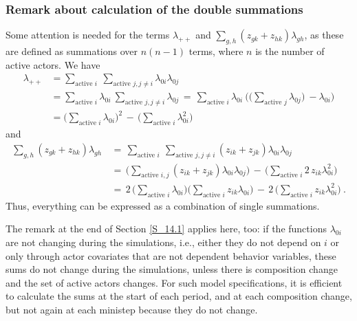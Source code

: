 \documentclass[a4paper,12pt,fleqn]{article}
\begin{document}
\subsubsection{Remark about calculation of the double summations}
Some attention is needed for the terms
$\lambda_{++}$ and
$\sum_{g,h} (z_{gk}+z_{hk})\lambda_{gh} $,
as these are defined as summations over $n(n-1)$ terms,
where $n$ is the number of active actors.
We have
\begin{align*}
 \lambda_{++} &=  \sum_{\text{active } i} \ \sum_{\text{active } j, j \neq i} \lambda_{0i}\lambda_{0j} \\
              &=  \sum_{\text{active } i} \lambda_{0i} \ \sum_{\text{active } j, j \neq i} \lambda_{0j}
                  \,=\,   \sum_{\text{active } i} \lambda_{0i} \
                              \Bigg( \Big( \sum_{\text{active } j} \lambda_{0j} \Big) \ - \lambda_{0i} \Bigg) \\
              &=  \Big(\sum_{\text{active } i} \lambda_{0i} \Big)^2
                     \,-\,  \Big(\sum_{\text{active } i} \lambda_{0i}^2 \Big)
\end{align*}
and
\begin{align*}
\sum_{g,h} (z_{gk}+z_{hk})\lambda_{gh} \, &= \,
            \sum_{\text{active } i} \ \sum_{\text{active } j, j \neq i} (z_{ik}+z_{jk})\lambda_{0i} \lambda_{0j}\\
           \,   &= \, \Big( \sum_{\text{active } i,j}   (z_{ik}+z_{jk})\lambda_{0i} \lambda_{0j} \Big)
               \,-\, \Big(  \sum_{\text{active } i}   2 \, z_{ik} \lambda_{0i}^2   \Big)  \\
           \,   &= \,   2 \,  \Big(\sum_{\text{active } i} \lambda_{0i} \Big)
                         \Big(\sum_{\text{active } i} z_{ik} \lambda_{0i} \Big)
                     \,-\, 2\, \Big(\sum_{\text{active } i} z_{ik} \lambda_{0i}^2 \Big) \ .
\end{align*}
Thus, everything can be expressed as a combination of single summations.

The remark at the end of Section  \ref{S_14.1} applies here, too:
if the functions $\lambda_{0i}$
are not changing during the simulations,
i.e., either they do not depend on $i$ or only through
actor covariates that are not dependent behavior variables,
these sums do not change during the simulations, unless there is composition change
and the set of active actors changes.
For such model specifications, it is efficient to calculate the sums
at the start of each period, and at each composition change,
but not again at each ministep because they do not change.
\end{document}
